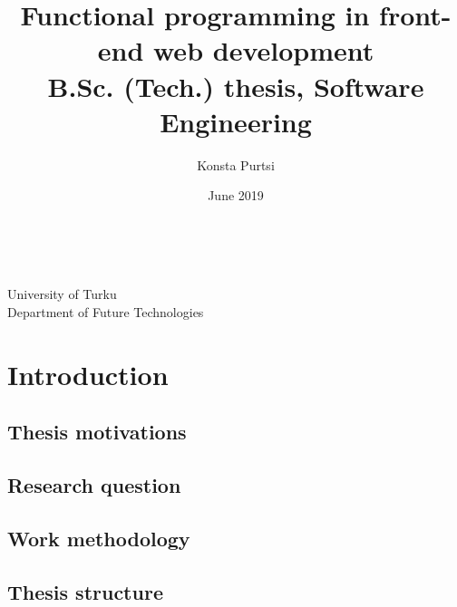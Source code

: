 \documentclass[12pt, titlepage]{article}
\title{Functional programming in front-end web development \\ {\normalsize
B.Sc. (Tech.) thesis, Software Engineering}}
\author{Konsta Purtsi}
\date{June 2019}
\makeatletter
\let\inserttitle\@title
\let\insertauthor\@author
\let\insertdate\@date
\makeatother
\begin{document}
\pagestyle{empty}

\vspace*{\fill}
\begin{center}\Large %
\inserttitle
\end{center}

\vspace{0.3cm}
\begin{center}
\insertauthor \\
\insertdate
\end{center}

\vfill
\begin{center}
University of Turku\\
Department of Future Technologies
\end{center}

\begin{center} %
\end{center}

\newpage
\tableofcontents

\newpage

\pagestyle{plain}
\setcounter{page}{1}

\section{Introduction}

\subsection{Thesis motivations}

\subsection{Research question}

\subsection{Work methodology}

\subsection{Thesis structure}
\end{document}
